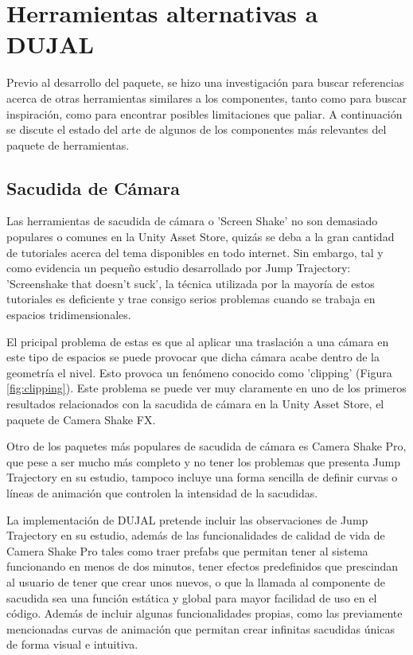 \section{Herramientas alternativas a DUJAL}
Previo al desarrollo del paquete, se hizo una investigación para buscar referencias acerca de otras herramientas similares a los componentes,
 tanto como para buscar inspiración, como para encontrar posibles limitaciones que paliar. A continuación se discute el estado del arte de algunos de los componentes más relevantes del paquete de herramientas.

\subsection{Sacudida de Cámara}
Las herramientas de sacudida de cámara o 'Screen Shake' no son demasiado populares o comunes en la Unity Asset Store\cite{unityAssetStore}, quizás se deba a la gran cantidad de tutoriales acerca del tema disponibles en 
todo internet. Sin embargo, tal y como evidencia un pequeño estudio desarrollado por Jump Trajectory: 'Screenshake that doesn’t suck'\cite{Screenshake}, la técnica utilizada por la mayoría de estos tutoriales es deficiente
y trae consigo serios problemas cuando se trabaja en espacios tridimensionales. 

El pricipal problema de estas es que al aplicar una traslación a una cámara en este tipo de espacios se puede provocar que dicha cámara acabe dentro 
de la geometría el nivel. Esto provoca un fenómeno conocido como 'clipping' (Figura \ref{fig:clipping}). Este problema se puede ver muy claramente en uno de los primeros resultados relacionados con la sacudida de cámara en la Unity Asset 
Store\cite{unityAssetStore}, el paquete de Camera Shake FX\cite{ShakeFX}. 

Otro de los paquetes más populares de sacudida de cámara es Camera Shake Pro\cite{ShakePro}, que pese a ser mucho más completo y no tener los problemas 
que presenta Jump Trajectory en su estudio, tampoco incluye una forma sencilla de definir curvas o líneas de animación que controlen la intensidad de la sacudidas. 

La implementación de DUJAL pretende incluir las observaciones 
de Jump Trajectory en su estudio, además de las funcionalidades de calidad de vida de Camera Shake Pro\cite{ShakePro} tales como traer prefabs que permitan tener al sistema funcionando en menos de dos minutos, tener 
efectos predefinidos que prescindan al usuario de tener que crear unos nuevos, o que la llamada al componente de sacudida sea una función estática y global para mayor facilidad de uso en el código. Además de incluir algunas
funcionalidades propias, como las previamente mencionadas curvas de animación que permitan crear infinitas sacudidas únicas de forma visual e intuitiva.

